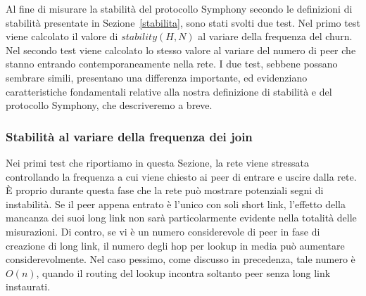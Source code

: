 \documentclass[prodmode,acmtap]{acmlarge}
\begin{document}
Al fine di misurare la stabilità del protocollo Symphony secondo le definizioni di stabilità presentate in Sezione~\ref{stabilita}, sono stati svolti due test. Nel primo test viene calcolato il valore di $stability(H,N)$ al variare della frequenza del churn. Nel secondo test viene calcolato lo stesso valore al variare del numero di peer che stanno entrando contemporaneamente nella rete. I due test, sebbene possano sembrare simili, presentano una differenza importante, ed evidenziano caratteristiche fondamentali relative alla nostra definizione di stabilità e del protocollo Symphony, che descriveremo a breve.


\subsubsection{Stabilità al variare della frequenza dei join}

Nei primi test che riportiamo in questa Sezione, la rete viene stressata controllando la frequenza a cui viene chiesto ai peer di entrare e uscire dalla rete.
È proprio durante questa fase che la rete può mostrare potenziali segni di instabilità. Se il peer appena entrato è l'unico con soli short link, l'effetto della mancanza dei suoi long link non sarà particolarmente evidente nella totalità delle misurazioni.
Di contro, se vi è un numero considerevole di peer in fase di creazione di long link, il numero degli hop per lookup in media può aumentare considerevolmente. Nel caso pessimo, come discusso in precedenza, tale numero è $O(n)$, quando il routing del lookup incontra soltanto peer senza long link instaurati.
\end{document}
